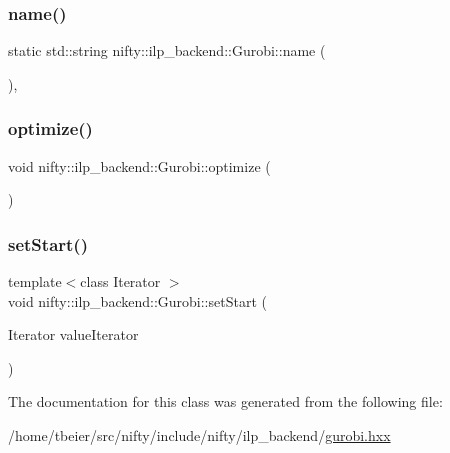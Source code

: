 \mbox{\label{classnifty_1_1ilp__backend_1_1Gurobi_a3c80f9769e9f33482397305e234b0aa7}} 
\subsubsection{\texorpdfstring{name()}{name()}}
{\footnotesize\ttfamily static std\+::string nifty\+::ilp\+\_\+backend\+::\+Gurobi\+::name (\begin{DoxyParamCaption}{ }\end{DoxyParamCaption})\hspace{0.3cm}{\ttfamily [inline]}, {\ttfamily [static]}}

\mbox{\label{classnifty_1_1ilp__backend_1_1Gurobi_a2521e51c0cdfb1e029d332ab7f203021}} 
\subsubsection{\texorpdfstring{optimize()}{optimize()}}
{\footnotesize\ttfamily void nifty\+::ilp\+\_\+backend\+::\+Gurobi\+::optimize (\begin{DoxyParamCaption}{ }\end{DoxyParamCaption})\hspace{0.3cm}{\ttfamily [inline]}}

\mbox{\label{classnifty_1_1ilp__backend_1_1Gurobi_a0875ce6a8a39917a496ec650c68da6a0}} 
\subsubsection{\texorpdfstring{set\+Start()}{setStart()}}
{\footnotesize\ttfamily template$<$class Iterator $>$ \\
void nifty\+::ilp\+\_\+backend\+::\+Gurobi\+::set\+Start (\begin{DoxyParamCaption}\item[{Iterator}]{value\+Iterator }\end{DoxyParamCaption})\hspace{0.3cm}{\ttfamily [inline]}}



The documentation for this class was generated from the following file\+:\begin{DoxyCompactItemize}
\item 
/home/tbeier/src/nifty/include/nifty/ilp\+\_\+backend/\hyperlink{gurobi_8hxx}{gurobi.\+hxx}\end{DoxyCompactItemize}
